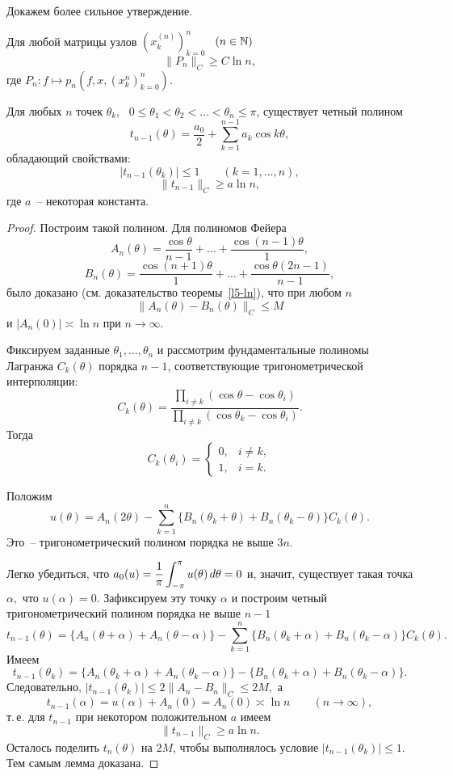 Докажем более сильное утверждение.

\begin{teo}
 Для любой матрицы узлов {$(x_k^{(n)})_{k=0}^n$~ $(n \in \mathbb{N})$}
$$
\|P_n\|_C\ge C\ln n,
$$
где {$P_n\colon f \mapsto p_n(f,x,(x_k^n)_{k=0}^n)$.}
\end{teo}

\begin{lemma}
Для любых $n$ точек $\theta_k$,~ $0\le \theta_1<\theta_2<\ldots<\theta_n\le \pi$,
существует четный полином
$$
{t_{n-1}}{(\theta)}=\frac{a_0}{2}+\sum\limits_{k=1}^{n-1} a_k\cos k\theta,
$$
обладающий свойствами:
$$
|{t_{n-1}}(\theta_k)|\le 1\qquad (k=1,\ldots,n),
$$
$$
\|{t_{n-1}}\|_C\ge a\ln n,
$$
где $a$~-- некоторая константа.
\end{lemma}

\begin{proof}
Построим такой полином. Для полиномов Фейера
$$
A_n(\theta)=\frac{\cos \theta }{n-1}+\ldots+\frac{\cos(n-1)\theta}{1},
$$
$$
B_n(\theta)=\frac{\cos(n+1) \theta}{1}+\ldots+\frac{\cos
\theta(2n-1)}{n-1},
$$
было доказано {(см. доказательство теоремы~\ref{l5-ln})}, что при любом $n$
$$
\| A_n(\theta)-B_n(\theta)\|_C\le M
$$
и $|A_n(0)|\asymp \ln n$ при $n\to \infty.$

Фиксируем заданные $\theta_1,\ldots,\theta_n$ и рассмотрим фундаментальные
полиномы Лагранжа $C_k(\theta)$ порядка $n-1$, соответствующие
тригонометрической интерполяции:
$$
C_k(\theta)=\frac{\prod\limits_{i\ne k} (\cos \theta - \cos\theta_i)}
 {\prod\limits_{i\ne k} (\cos \theta_k - \cos\theta_i)}.
$$
Тогда
$$
C_k(\theta_i)=
\begin{cases}
0,& i\ne k,\\
1,& i=k.
\end{cases}
$$

Положим
$$
u(\theta)=A_n(2\theta)-\sum\limits_{k=1}^n \{ B_n(\theta_k+\theta)+
B_n(\theta_k-\theta)\} C_k(\theta).
$$
Это~-- тригонометрический полином порядка не выше $3n$.

Легко убедиться, что $a_0(u)=\dfrac{1}{\pi}\displaystyle\int_{-\pi}^{\pi} u(\theta)\, d\theta=0$
{и,} значит, существует такая точка $\alpha,$ что $u(\alpha)=0.$ Зафиксируем эту
точку $\alpha$ и построим четный тригонометрический полином порядка не выше $n-1$
$$
{t_{n-1}}(\theta)=\{A_n(\theta+\alpha)+A_n(\theta-\alpha)\}-\sum\limits_{k=1}^n\{B_n(\theta_k+
\alpha)+B_n(\theta_k-\alpha)\} C_k(\theta).
$$
Имеем
$$
{t_{n-1}}(\theta_k)=\{A_n(\theta_k+\alpha)+A_n(\theta_k-\alpha)\}-\{B_n
(\theta_k+\alpha)+B_n(\theta_k-\alpha)\}.
$$
Следовательно, $|{t_{n-1}}(\theta_k)|\le 2\|A_n-B_n\|_C{\le 2 M},$ {а}
$$
{t_{n-1}}(\alpha)=u(\alpha)+A_n(0)=A_n(0)\asymp \ln n \qquad (n\to\infty),
$$
т.\,е. для {$t_{n-1}$} при некотором положительном $a$ имеем
$$
\|t_{n-1}\|_C\ge a\ln n.
$$
Осталось поделить $t_n(\theta)$ на $2M$, чтобы выполнялось условие $|t_{n-1}(\theta_k)|\le 1.$
Тем самым лемма доказана.
\end{proof}

